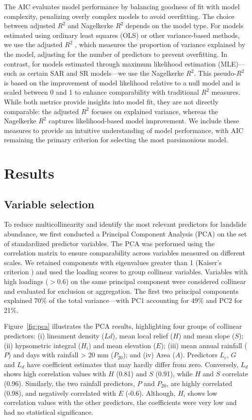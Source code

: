 \documentclass[lineno,pdflatex,sn-basic]{sn-jnl}%
\theoremstyle{thmstyleone}%
\theoremstyle{thmstyletwo}%
\theoremstyle{thmstylethree}%
\begin{document}
The AIC evaluates model performance by balancing goodness of fit with model complexity, penalizing overly complex models to avoid overfitting. 
The choice between adjusted $R^2$ and Nagelkerke $R^2$ depends on the model type. 
For models estimated using ordinary least squares (OLS) or other variance-based methods, we use the adjusted $R^2$ \citep{nagelkerke1991note}, which measures the proportion of variance explained by the model, adjusting for the number of predictors to prevent overfitting. 
In contrast, for models estimated through maximum likelihood estimation (MLE)—such as certain SAR and SR models—we use the Nagelkerke $R^2$. 
This pseudo-$R^2$ is based on the improvement of model likelihood relative to a null model and is scaled between 0 and 1 to enhance comparability with traditional $R^2$ measures.
While both metrics provide insights into model fit, they are not directly comparable: the adjusted $R^2$ focuses on explained variance, whereas the Nagelkerke $R^2$ captures likelihood-based model improvement. 
We include these measures to provide an intuitive understanding of model performance, with AIC remaining the primary criterion for selecting the most parsimonious model. 

\section{Results}\label{results}

\subsection{Variable selection} \label{variableSelection}

To reduce multicollinearity and identify the most relevant predictors for landslide abundance, we first conducted a Principal Component Analysis (PCA) on the set of standardized predictor variables. 
The PCA was performed using the correlation matrix to ensure comparability across variables measured on different scales. 
We retained components with eigenvalues greater than 1 (Kaiser’s criterion \citep{kaiser1960application}) and used the loading scores to group collinear variables. 
Variables with high loadings ($>0.6$) on the same principal component were considered collinear and evaluated for exclusion or aggregation. 
The first two principal components explained 70\% of the total variance—with PC1 accounting for 49\% and PC2 for 21\%.

Figure~\ref{fig:pca} illustrates the PCA results, highlighting four groups of collinear predictors: (i) lineament density ($Ld$), mean local relief ($H$) and mean slope ($S$); (ii) hypsometric integral ($H_i$) and mean elevation ($E$); (iii) mean annual rainfall ($P$) and days with rainfall > 20 mm ($P_{20}$); and (iv) Area ($A$). Predictors $L_c$, $G$ and $L_d$ have coefficient estimates that may hardly differ from zero. 
Conversely, $L_d$ shows high correlation values with $H$ (0.81) and $S$ (0.91), while $H$ and $S$ correlate (0.96). 
Similarly, the two rainfall predictors, $P$ and $P_{20}$, are highly correlated (0.98), and negatively correlated with $E$ (-0.6). 
Although, $H_i$ shows low correlation values with the other predictors, the coefficients were very low and had no statistical significance. 
\end{document}
